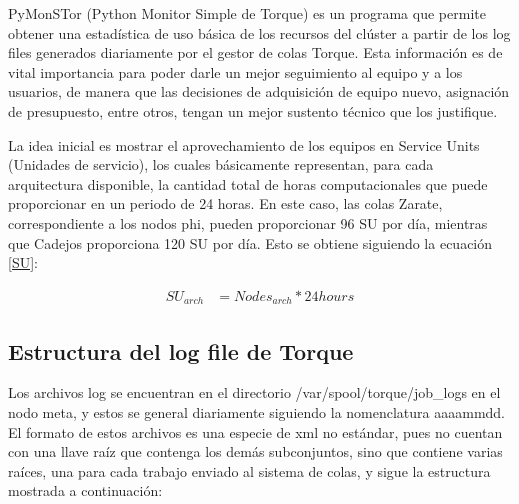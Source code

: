 PyMonSTor (Python Monitor Simple de Torque) es un programa que permite obtener una estadística de uso básica de los recursos del clúster a partir de los log files generados diariamente por el gestor de colas Torque. Esta información es de vital importancia para poder darle un mejor seguimiento al equipo y a los usuarios, de manera que las decisiones de adquisición de equipo nuevo, asignación de presupuesto, entre otros, tengan un mejor sustento técnico que los justifique.

La idea inicial es mostrar el aprovechamiento de los equipos en Service Units (Unidades de servicio), los cuales básicamente representan, para cada arquitectura disponible, la cantidad total de horas computacionales que puede proporcionar en un periodo de 24 horas. En este caso, las colas Zarate, correspondiente a los nodos phi, pueden proporcionar 96 SU por día, mientras que Cadejos proporciona 120 SU por día. Esto se obtiene siguiendo la ecuación \ref{SU}:

\begin{align}
SU_{arch} &= Nodes_{arch}*24 hours \label{SU}
\end{align}

\subsection{Estructura del log file de Torque}
Los archivos log se encuentran en el directorio /var/spool/torque/job\_logs en el nodo meta, y estos se general diariamente siguiendo la nomenclatura aaaammdd. El formato de estos archivos es una especie de xml no estándar, pues no cuentan con una llave raíz que contenga los demás subconjuntos, sino que contiene varias raíces, una para cada trabajo enviado al sistema de colas, y sigue la estructura mostrada a continuación:

